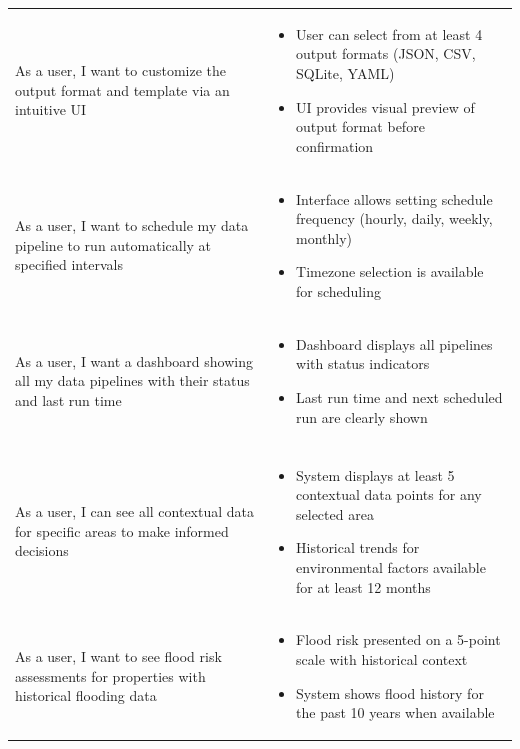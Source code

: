 \begin{longtable}{>{\raggedright\arraybackslash}p{}>{\raggedright\arraybackslash}p{}}
	\rowcolor[gray]{0.95}
	As a user, I want to customize the output format and template via an intuitive UI &
	\begin{itemize}
	\item User can select from at least 4 output formats (JSON, CSV, SQLite, YAML)
	\item UI provides visual preview of output format before confirmation
	\end{itemize} \\
	  
	As a user, I want to schedule my data pipeline to run automatically at specified intervals &
	\begin{itemize}
	\item Interface allows setting schedule frequency (hourly, daily, weekly, monthly)
	\item Timezone selection is available for scheduling
	\end{itemize} \\
	  
	\rowcolor[gray]{0.95}
	As a user, I want a dashboard showing all my data pipelines with their status and last run time &
	\begin{itemize}
	\item Dashboard displays all pipelines with status indicators
	\item Last run time and next scheduled run are clearly shown
	\end{itemize} \\
	
	\midrule
	\multicolumn{2}{l}{\textbf{Local Contextual Analytics}} \\
	\midrule
	As a user, I can see all contextual data for specific areas to make informed decisions &
	\begin{itemize}
	\item System displays at least 5 contextual data points for any selected area
	\item Historical trends for environmental factors available for at least 12 months
	\end{itemize} \\
	  
	\rowcolor[gray]{0.95}
	As a user, I want to see flood risk assessments for properties with historical flooding data &
	\begin{itemize}
	\item Flood risk presented on a 5-point scale with historical context
	\item System shows flood history for the past 10 years when available
	\end{itemize} \\
	  

\end{longtable}
